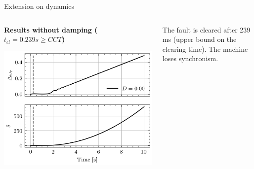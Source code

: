 \begin{frame} {Extension on dynamics}
    \begin{columns}
    \begin{column}{0.55\textwidth}
        \textbf{Results without damping ($t_{cl} = 0.239 s \geq CCT$)}
        \begin{center}
        \includegraphics[width=0.9\linewidth]{images/P-dynamics_failed.png}
        \end{center}
    \end{column}
    \begin{column}{0.45\textwidth}
        The fault is cleared after 239 ms (upper bound on the clearing time). The machine loses synchronism.
    \end{column}
\end{columns}

\end{frame}


